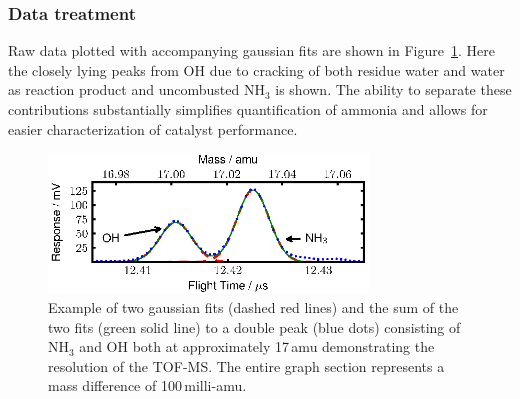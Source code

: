 \documentclass[aip,rsi]{revtex4-1}
\begin{document}
\subsubsection{Data treatment}
Raw data plotted with accompanying gaussian fits are shown in Figure~\ref{fig:gaussian_fit}. Here the closely lying peaks from OH due to cracking of both residue water and water as reaction product and uncombusted NH$_3$ is shown. The ability to separate these contributions substantially simplifies quantification of ammonia and allows for easier characterization of catalyst performance. 
\begin{figure}
 \includegraphics[width=8.5cm]{ammonia_OH_gauss_fit.eps}%
 \caption{Example of two gaussian fits (dashed red lines) and the sum of the two fits (green solid line) to a double peak (blue dots) consisting of NH$_{3}$ and OH both at approximately 17\,amu demonstrating the resolution of the TOF-MS. The entire graph section represents a mass difference of 100\,milli-amu.\label{fig:gaussian_fit}}%
\end{figure}
\end{document}
